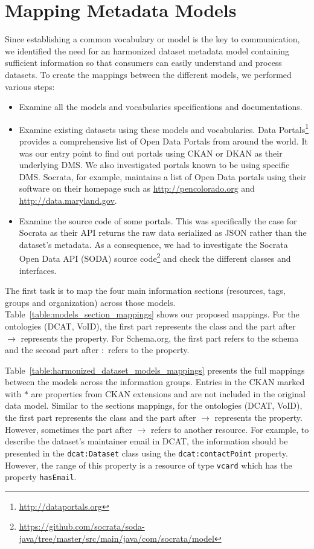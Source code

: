 
\section{Mapping Metadata Models}
\label{section:model_mappings}

Since establishing a common vocabulary or model is the key to communication, we identified the need for an harmonized dataset metadata model containing sufficient information so that consumers can easily understand and process datasets. To create the mappings between the different models, we performed various steps:
\begin{itemize}
  \item Examine all the models and vocabularies specifications and documentations.
  \item Examine existing datasets using these models and vocabularies. Data Portals\footnote{\url{http://dataportals.org}} provides a comprehensive list of Open Data Portals from around the world. It was our entry point to find out portals using CKAN or DKAN as their underlying DMS. We also investigated portals known to be using specific DMS. Socrata, for example, maintains a list of Open Data portals using their software on their homepage such as \url{http://pencolorado.org} and \url{http://data.maryland.gov}.
  \item Examine the source code of some portals. This was specifically the case for Socrata as their API returns the raw data serialized as JSON rather than the dataset's metadata. As a consequence, we had to investigate the Socrata Open Data API (SODA) source code\footnote{\url{https://github.com/socrata/soda-java/tree/master/src/main/java/com/socrata/model}} and check the different classes and interfaces.
\end{itemize}

The first task is to map the four main information sections (resources, tags, groups and organization) across those models. Table~\ref{table:models_section_mappings} shows our proposed mappings. For the ontologies (DCAT, VoID), the first part represents the class and the part after $\rightarrow$ represents the property. For Schema.org, the first part refers to the schema and the second part after $:$ refers to the property.

Table~\ref{table:harmonized_dataset_models_mappings} presents the full mappings between the models across the information groups. Entries in the CKAN marked with $\ast$ are properties from CKAN extensions and are not included in the original data model. Similar to the sections mappings, for the ontologies (DCAT, VoID), the first part represents the class and the part after $\rightarrow$ represents the property. However, sometimes the part after $\rightarrow$ refers to another resource. For example, to describe the dataset's maintainer email in DCAT, the information should be presented in the \texttt{dcat:Dataset} class using the \texttt{dcat:contactPoint} property. However, the range of this property is a resource of type \texttt{vcard} which has the property \texttt{hasEmail}.

